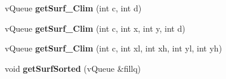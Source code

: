 \begin{DoxyCompactItemize}
\item 
v\+Queue {\bfseries get\+Surf\+\_\+\+Clim} (int c, int d)\hypertarget{classev_1_1vSurface2_af9e9a30828d508f49921b02224723a36}{}\label{classev_1_1vSurface2_af9e9a30828d508f49921b02224723a36}

\item 
v\+Queue {\bfseries get\+Surf\+\_\+\+Clim} (int c, int x, int y, int d)\hypertarget{classev_1_1vSurface2_a708416f0ae3b13858f1c96e203898223}{}\label{classev_1_1vSurface2_a708416f0ae3b13858f1c96e203898223}

\item 
v\+Queue {\bfseries get\+Surf\+\_\+\+Clim} (int c, int xl, int xh, int yl, int yh)\hypertarget{classev_1_1vSurface2_a1b04ff8d8d449b054a514c092bac1145}{}\label{classev_1_1vSurface2_a1b04ff8d8d449b054a514c092bac1145}

\item 
void {\bfseries get\+Surf\+Sorted} (v\+Queue \&fillq)\hypertarget{classev_1_1vSurface2_aacd14a2e5c73e557b7b6b90a20624e23}{}\label{classev_1_1vSurface2_aacd14a2e5c73e557b7b6b90a20624e23}

\end{DoxyCompactItemize}
